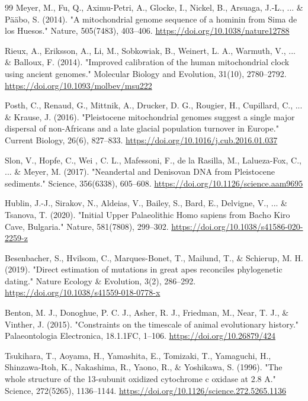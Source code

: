 \documentclass[10pt,letterpaper]{article}
\begin{document}
\begin{thebibliography}{99}
 Meyer, M., Fu, Q., Aximu-Petri, A., Glocke, I., Nickel, B., Arsuaga, J.-L., ... \& P\"a\"abo, S. (2014). "A mitochondrial genome sequence of a hominin from Sima de los Huesos." Nature, 505(7483), 403--406. \url{https://doi.org/10.1038/nature12788}

 Rieux, A., Eriksson, A., Li, M., Sobkowiak, B., Weinert, L. A., Warmuth, V., ... \& Balloux, F. (2014). "Improved calibration of the human mitochondrial clock using ancient genomes." Molecular Biology and Evolution, 31(10), 2780--2792. \url{https://doi.org/10.1093/molbev/msu222}

 Posth, C., Renaud, G., Mittnik, A., Drucker, D. G., Rougier, H., Cupillard, C., ... \& Krause, J. (2016). "Pleistocene mitochondrial genomes suggest a single major dispersal of non-Africans and a late glacial population turnover in Europe." Current Biology, 26(6), 827--833. \url{https://doi.org/10.1016/j.cub.2016.01.037}

 Slon, V., Hopfe, C., Wei , C. L., Mafessoni, F., de la Rasilla, M., Lalueza-Fox, C., ... \& Meyer, M. (2017). "Neandertal and Denisovan DNA from Pleistocene sediments." Science, 356(6338), 605--608. \url{https://doi.org/10.1126/science.aam9695}

 Hublin, J.-J., Sirakov, N., Aldeias, V., Bailey, S., Bard, E., Delvigne, V., ... \& Tsanova, T. (2020). "Initial Upper Palaeolithic Homo sapiens from Bacho Kiro Cave, Bulgaria." Nature, 581(7808), 299--302. \url{https://doi.org/10.1038/s41586-020-2259-z}

 Besenbacher, S., Hvilsom, C., Marques-Bonet, T., Mailund, T., \& Schierup, M. H. (2019). "Direct estimation of mutations in great apes reconciles phylogenetic dating." Nature Ecology \& Evolution, 3(2), 286--292. \url{https://doi.org/10.1038/s41559-018-0778-x}

 Benton, M. J., Donoghue, P. C. J., Asher, R. J., Friedman, M., Near, T. J., \& Vinther, J. (2015). "Constraints on the timescale of animal evolutionary history." Palaeontologia Electronica, 18.1.1FC, 1--106. \url{https://doi.org/10.26879/424}

 Tsukihara, T., Aoyama, H., Yamashita, E., Tomizaki, T., Yamaguchi, H., Shinzawa-Itoh, K., Nakashima, R., Yaono, R., \& Yoshikawa, S. (1996). "The whole structure of the 13-subunit oxidized cytochrome c oxidase at 2.8 A." Science, 272(5265), 1136--1144. \url{https://doi.org/10.1126/science.272.5265.1136}


\end{thebibliography}
\end{document}
